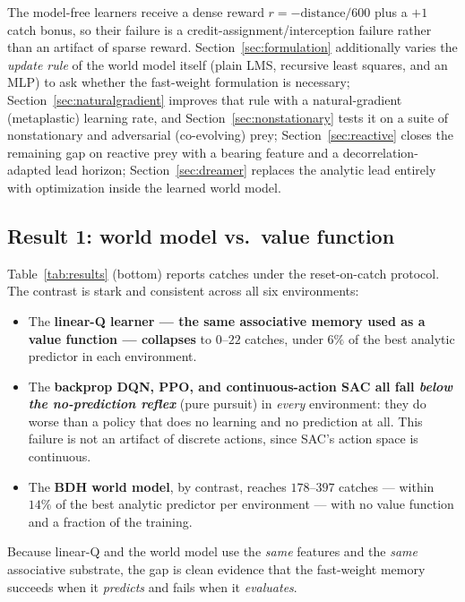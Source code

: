 \documentclass[11pt]{article}
\begin{document}
The model-free learners receive a dense reward $r = -\text{distance}/600$ plus a $+1$ catch
bonus, so their failure is a credit-assignment/interception failure rather than an artifact of
sparse reward. Section~\ref{sec:formulation} additionally varies the \emph{update rule} of the
world model itself (plain LMS, recursive least squares, and an MLP) to ask whether the
fast-weight formulation is necessary; Section~\ref{sec:naturalgradient} improves that rule with
a natural-gradient (metaplastic) learning rate, and Section~\ref{sec:nonstationary} tests it on
a suite of nonstationary and adversarial (co-evolving) prey; Section~\ref{sec:reactive} closes the
remaining gap on reactive prey with a bearing feature and a decorrelation-adapted lead horizon;
Section~\ref{sec:dreamer} replaces the analytic lead entirely with optimization inside the learned
world model.

\subsection{Result 1: world model vs.\ value function}

Table~\ref{tab:results} (bottom) reports catches under the reset-on-catch protocol. The
contrast is stark and consistent across all six environments:

\begin{itemize}
\item The \textbf{linear-Q learner --- the same associative memory used as a value function ---
  collapses} to $0$--$22$ catches, under $6\%$ of the best analytic predictor in each
  environment.
\item The \textbf{backprop DQN, PPO, and continuous-action SAC all fall \emph{below the
  no-prediction reflex}} (pure pursuit) in \emph{every} environment: they do worse than a
  policy that does no learning and no prediction at all. This failure is not an artifact of
  discrete actions, since SAC's action space is continuous.
\item The \textbf{BDH world model}, by contrast, reaches $178$--$397$ catches --- within $14\%$
  of the best analytic predictor per environment --- with no value function and a fraction of
  the training.
\end{itemize}

Because linear-Q and the world model use the \emph{same} features and the \emph{same}
associative substrate, the gap is clean evidence that the fast-weight memory succeeds when it
\emph{predicts} and fails when it \emph{evaluates}.
\end{document}
